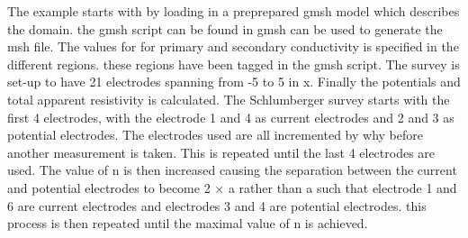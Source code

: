 The example starts with by loading in a preprepared gmsh model which describes 
the domain. the gmsh script can be found in 
gmsh can be used to generate the msh file. The values for for primary and secondary 
conductivity is specified in the different regions. these regions have been tagged
in the gmsh script. The survey is set-up to have 21 electrodes spanning from -5 to 5
in x. Finally the potentials and total apparent resistivity is calculated. The Schlumberger
survey starts with the first 4 electrodes, with the electrode 1 and 4 as current electrodes and 
2 and 3 as potential electrodes. The electrodes used are all incremented by why before another 
measurement is taken. This is repeated until the last 4 electrodes are used. The value of n is then increased
causing the  separation between the current and potential electrodes to become 2 $\times$ a rather than a 
such that electrode 1 and 6 are current electrodes and electrodes 3 and 4 are potential electrodes. 
this process is then repeated until the maximal value of n is achieved. 
 